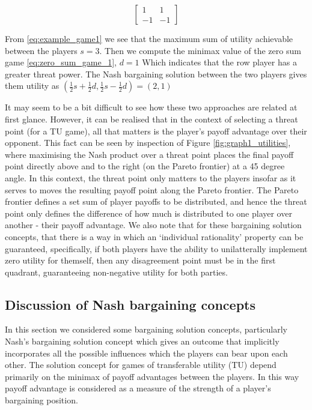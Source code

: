 \begin{equation}\label{eq:zero_sum_game_1} \begin{bmatrix}1 & 1\\ -1 & -1\end{bmatrix} \end{equation}

\begin{solution}[TU approach]
From \eqref{eq:example_game1} we see that the maximum sum of utility achievable between the players $s=3$. Then we compute the minimax value of the zero sum game \eqref{eq:zero_sum_game_1}, $d=1$ Which indicates that the row player has a greater threat power.
The Nash bargaining solution between the two players gives them utility as $(\frac{1}{2}s+\frac{1}{2}d,\frac{1}{2}s-\frac{1}{2}d) = (2,1)$
\end{solution}

It may seem to be a bit difficult to see how these two approaches are related at first glance.
However, it can be realised that in the context of selecting a threat point (for a TU game), all that matters is the player's payoff advantage over their opponent.
This fact can be seen by inspection of Figure \ref{fig:graph1_utilities}, where maximising the Nash product over a threat point places the final payoff point directly above and to the right (on the Pareto frontier) at a 45 degree angle.
In this context, the threat point only matters to the players insofar as it serves to moves the resulting payoff point along the Pareto frontier.
The Pareto frontier defines a set sum of player payoffs to be distributed, and hence the threat point only defines the difference of how much is distributed to one player over another - their payoff advantage. We also note that for these bargaining solution concepts, that there is a way in which an `individual rationality' property can be guaranteed, specifically, if both players have the ability to unilatterally implement zero utility for themself, then any disagreement point must be in the first quadrant, guaranteeing non-negative utility for both parties.

\subsection{Discussion of Nash bargaining concepts}

In this section we considered some bargaining solution concepts, particularly Nash's bargaining solution concept which gives an outcome that implicitly incorporates all the possible influences which the players can bear upon each other.
The solution concept for games of transferable utility (TU) depend primarily on the minimax of payoff advantages between the players.
In this way payoff advantage is considered as a measure of the strength of a player's bargaining position.

